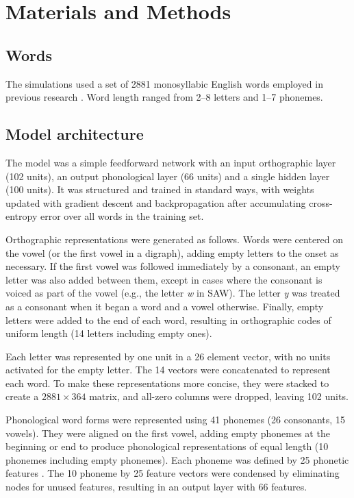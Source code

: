 \documentclass[10pt,letterpaper]{article}
\newcommand{\exword}[1]{\MakeUppercase{#1}}
\newcommand{\gorl}{letter}
\newcommand{\gorls}{\gorl{}s}
\newcommand{\xy}[2]{$#1\times#2$}
\begin{document}
\section{Materials and Methods}

\subsection{Words}

The simulations used a set of 2881 monosyllabic English words employed in previous research \cite{Harm1999}. Word length ranged from 2--8 letters and 1--7 phonemes.

\subsection{Model architecture}

The model was a simple feedforward network with an input orthographic layer (102 units), an output phonological layer (66 units) and a single hidden layer (100 units). It was structured and trained in standard ways, with weights updated with gradient descent and backpropagation after accumulating cross-entropy error over all words in the training set. 

Orthographic representations were generated as follows. Words were centered on the vowel (or the first vowel in a digraph), adding empty \gorls{} to the onset as necessary. If the first vowel was followed immediately by a consonant, an empty \gorl{} was also added between them, except in cases where the consonant is voiced as part of the vowel (e.g., the letter \textit{w} in \exword{saw}). The letter \textit{y} was treated as a consonant when it began a word and a vowel otherwise. Finally, empty \gorls{} were added to the end of each word, resulting in orthographic codes of uniform length (14 \gorls{} including empty ones).

Each \gorl{} was represented by one unit in a 26 element vector, with no units activated for the empty \gorl{}. The 14 vectors were concatenated to represent each word. To make these representations more concise, they were stacked to create a \xy{2881}{364} matrix, and all-zero columns were dropped, leaving 102 units.

Phonological word forms were represented using 41 phonemes (26 consonants, 15 vowels).  They were aligned on the first vowel, adding empty phonemes at the beginning or end to produce phonological representations of equal length (10 phonemes including empty phonemes). Each phoneme was defined by 25 phonetic features \cite{Harm1999}. The 10 phoneme by 25 feature vectors were condensed by eliminating nodes for unused features, resulting in an output layer with 66 features.
\end{document}

